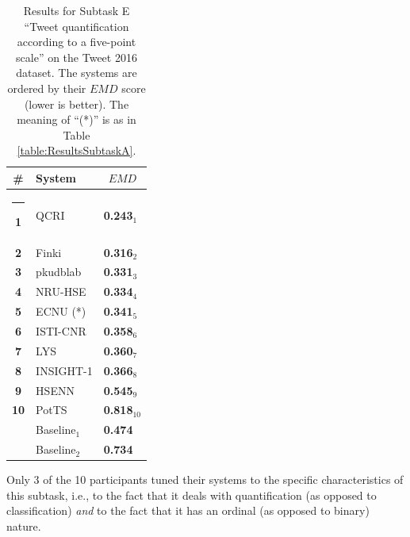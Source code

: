 \documentclass[11pt,letterpaper]{article}
\newif\ifdraft
\newcommand{\fabrizio}[1]{\ifdraft{\textcolor{cyan}{[Fabrizio]: {#1}}}\else{\vspace{0ex}}\fi}
\begin{document}
\renewcommand{\baselinestretch}{0.78}
\begin{table}[htb]
  \centering
  \begin{small}
    \renewcommand{\arraystretch}{1.0}%
    \begin{tabular}{|c|l|l|}
      \hline\rule[0ex]{0mm}{2ex} 
      \bf \# & \bf System & \multicolumn{1}{c|}{$EMD$} \\
      \hline\rule[0ex]{-1mm}{2ex}
      \bf 1 & QCRI & \bf 0.243$_{1}$ \\
      \bf 2 & Finki & \bf 0.316$_{2}$ \\
      \bf 3 & pkudblab & \bf 0.331$_{3}$ \\
      \bf 4 & NRU-HSE & \bf 0.334$_{4}$ \\
      \bf 5 & ECNU (*) & \bf 0.341$_{5}$ \\
      \bf 6 & ISTI-CNR & \bf 0.358$_{6}$ \\
      \bf 7 & LYS & \bf 0.360$_{7}$ \\
      \bf 8 & INSIGHT-1 & \bf 0.366$_{8}$ \\
      \bf 9 & HSENN & \bf 0.545$_{9}$ \\
      \bf 10 & PotTS & \bf 0.818$_{10}$ \\
      \hline\rule[0ex]{0mm}{2ex} 
      & Baseline$_1$ & \bf 0.474 \\
      & Baseline$_2$ & \bf 0.734 \\
      \hline
    \end{tabular}\medskip
 \caption{\label{table:ResultsSubtaskE} Results for Subtask E ``Tweet quantification according to a five-point scale'' on the Tweet 2016 dataset. The systems are ordered by their $EMD$ score (lower is better). The meaning of ``(*)'' is as in Table \ref{table:ResultsSubtaskA}.
 }
\end{small}
\end{table}
\renewcommand{\baselinestretch}{1.00}

Only 3 of the 10 participants tuned their systems to the specific
characteristics of this subtask, i.e., to the fact that it deals with
quantification (as opposed to classification) \textit{and} to the fact
that it has an ordinal (as opposed to binary) nature. 
\end{document}

